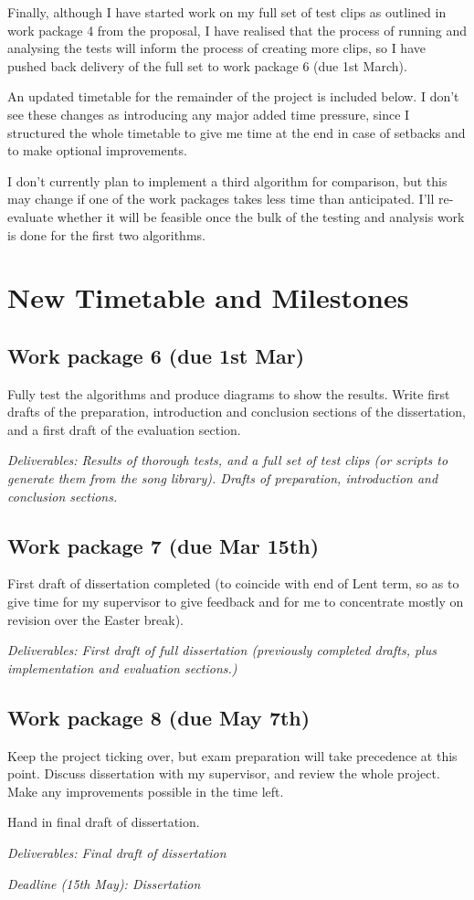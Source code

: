 \documentclass[12pt]{article}
\begin{document}
Finally, although I have started work on my full set of test clips as outlined in work package 4 from the proposal, I have realised that the process of running and analysing the tests will inform the process of creating more clips, so I have pushed back delivery of the full set to work package 6 (due 1st March).

An updated timetable for the remainder of the project is included below. I don't see these changes as introducing any major added time pressure, since I structured the whole timetable to give me time at the end in case of setbacks and to make optional improvements.

I don't currently plan to implement a third algorithm for comparison, but this may change if one of the work packages takes less time than anticipated. I'll re-evaluate whether it will be feasible once the bulk of the testing and analysis work is done for the first two algorithms.


\section*{New Timetable and Milestones}

\subsection*{Work package 6 (due 1st Mar)}
Fully test the algorithms and produce diagrams to show the results. Write first drafts of the preparation, introduction and conclusion sections of the dissertation, and a first draft of the evaluation section.

\emph{Deliverables: Results of thorough tests, and a full set of test clips (or scripts to generate them from the song library). Drafts of preparation, introduction and conclusion sections.}

\subsection*{Work package 7 (due Mar 15th)}
First draft of dissertation completed (to coincide with end of Lent term, so as to give time for my supervisor to give feedback and for me to concentrate mostly on revision over the Easter break).

\emph{Deliverables: First draft of full dissertation (previously completed drafts, plus implementation and evaluation sections.)}

\subsection*{Work package 8 (due May 7th)}
Keep the project ticking over, but exam preparation will take precedence at this point. Discuss dissertation with my supervisor, and review the whole project. Make any improvements possible in the time left.

Hand in final draft of dissertation. 

\emph{Deliverables: Final draft of dissertation}

\emph{Deadline (15th May): Dissertation}
\end{document}
